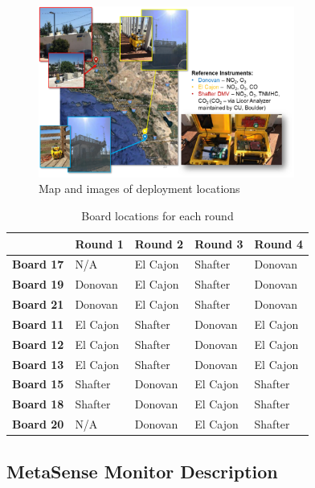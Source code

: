 \documentclass[journal abbreviation, manuscript]{copernicus}
\begin{document}
\begin{figure}[H]
\centering
\includegraphics[width=0.75\textwidth]{writeup/img/MSdeployment.png}
\caption{Map and images of deployment locations}
\label{fig:img-label}
\end{figure}


\begin{table}[H]
\centering
\caption{Board locations for each round}
\begin{tabular}{l|llll}
                  & \textbf{Round 1} & \textbf{Round 2} & \textbf{Round 3} & \textbf{Round 4} \\ \hline
\textbf{Board 17} & N/A & El Cajon  & Shafter     &Donovan    \\
\textbf{Board 19} & Donovan & El Cajon       & Shafter       &Donovan   \\
\textbf{Board 21} & Donovan          & El Cajon         & Shafter        &Donovan  \\ \hline
\textbf{Board 11} & El Cajon         & Shafter          & Donovan        &El Cajon  \\
\textbf{Board 12} & El Cajon         & Shafter          & Donovan        &El Cajon  \\
\textbf{Board 13} & El Cajon         & Shafter          & Donovan         &El Cajon  \\ \hline
\textbf{Board 15} & Shafter          & Donovan          & El Cajon     &Shafter    \\
\textbf{Board 18} & Shafter          & Donovan          & El Cajon    &Shafter     \\
\textbf{Board 20} & N/A & Donovan          & El Cajon    &Shafter   
\end{tabular}
\label{tab:board-rotations}
\end{table}


\subsection{MetaSense Monitor Description} %
\end{document}
